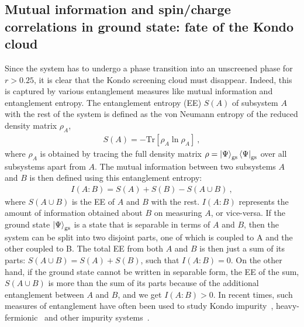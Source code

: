 \documentclass[reprint,superscriptaddress,floatfix]{revtex4-2}
\begin{document}
\subsection{Mutual information and spin/charge correlations in ground state: fate of the Kondo cloud}
Since the system has to undergo a phase transition into an unscreened phase for \(r > 0.25\), it is clear that the Kondo screening cloud must disappear. Indeed, this is captured by various entanglement measures like mutual information and entanglement entropy. The entanglement entropy (EE) \(S(A)\) of subsystem \(A\) with the rest of the system is defined as the von Neumann entropy of the reduced density matrix \(\rho_A\),
\begin{equation}\begin{aligned}
	S(A) = -\text{Tr}\left[\rho_A \ln \rho_A\right]~,
\end{aligned}\end{equation}
where \(\rho_A\) is obtained by tracing the full density matrix \(\rho = \ket{\Psi}_\text{gs} \bra{\Psi}_\text{gs}\) over all subsystems apart from \(A\). The mutual information between two subsystems \(A\) and \(B\) is then defined using this entanglement entropy:
\begin{equation}\begin{aligned}
	I(A:B) = S(A) + S(B) - S(A \cup B)~,
\end{aligned}\end{equation}
where \(S(A \cup B)\) is the EE of \(A\) and \(B\) with the rest. \(I(A:B)\) represents the amount of information obtained about \(B\) on measuring \(A\), or vice-versa. If the ground state \(\ket{\Psi}_\text{gs}\) is a state that is separable in terms of \(A\) and \(B\), then the system can be split into two disjoint parts, one of which is coupled to A and the other coupled to B.  The total EE from both \(A\) and \(B\) is then just a sum of its parts: \(S(A\cup B) = S(A) + S(B)\), such that \(I(A:B) = 0\). On the other hand, if the ground state cannot be written in separable form, the EE of the sum, \(S(A \cup B)\) is more than the sum of its parts because of the additional entanglement between \(A\) and \(B\), and we get \(I(A:B) > 0\). In recent times, such measures of entanglement have often been used to study Kondo impurity~\cite{Srensen2006}, heavy-fermionic~\cite{parisen_2019} and other impurity systems~\cite{dong_2021}.
\end{document}
